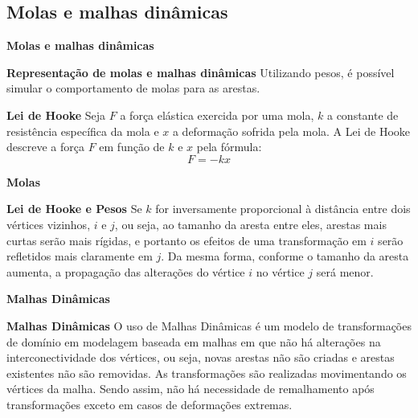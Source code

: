 \subsection{Molas e malhas dinâmicas}

\begin{frame}{{\bf \color{blue} Molas e malhas dinâmicas}}
	\begin{block}{\bf Representação de molas e malhas dinâmicas}
		Utilizando pesos, é possível simular o comportamento de molas para as arestas.
	\end{block}
	
	\begin{block}{\bf Lei de Hooke}
		Seja $F$ a força elástica exercida por uma mola, $k$ a constante de resistência específica da mola e $x$ a deformação sofrida pela mola.
		A Lei de Hooke descreve a força $F$ em função de $k$ e $x$ pela fórmula: 
		\begin{equation}
			F = -kx
		\end{equation}
	\end{block}
\end{frame}

\begin{frame}{{\bf \color{blue} Molas}}
	\begin{block}{\bf Lei de Hooke e Pesos}
		Se $k$ for inversamente proporcional à distância entre dois vértices vizinhos, $i$ e $j$, ou seja, ao tamanho da aresta entre eles, arestas mais curtas serão mais rígidas, e portanto os efeitos de uma transformação em $i$ serão refletidos mais claramente em $j$. Da mesma forma, conforme o tamanho da aresta aumenta, a propagação das alterações do vértice $i$ no vértice $j$ será menor. 
	\end{block}
\end{frame}

\begin{frame}{{\bf \color{blue} Malhas Dinâmicas}}
	
	\begin{block}{\bf Malhas Dinâmicas}
		O uso de Malhas Dinâmicas é um modelo de transformações de domínio em modelagem baseada em malhas em que não há alterações na interconectividade dos vértices, ou seja, novas arestas não são criadas e arestas existentes não são removidas. As transformações são realizadas movimentando os vértices da malha. Sendo assim, não há necessidade de remalhamento após transformações exceto em casos de deformações extremas.
	\end{block}
	
	
\end{frame}

